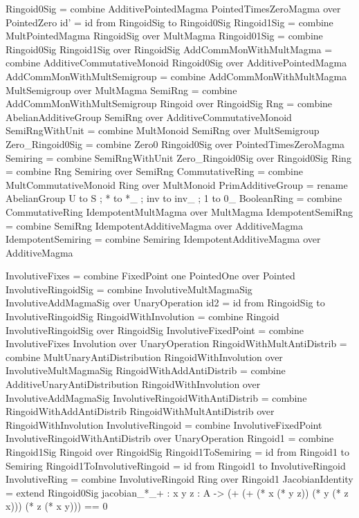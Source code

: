 \begin{togcode} 
Ringoid0Sig = 
  combine AdditivePointedMagma {} PointedTimesZeroMagma {} 
  over PointedZero
id' = id from RingoidSig to Ringoid0Sig 
Ringoid1Sig = combine MultPointedMagma {} RingoidSig {} over MultMagma
Ringoid01Sig = combine Ringoid0Sig {} Ringoid1Sig {} over RingoidSig
AddCommMonWithMultMagma = 
  combine AdditiveCommutativeMonoid {} Ringoid0Sig {} 
  over AdditivePointedMagma
AddCommMonWithMultSemigroup = 
  combine AddCommMonWithMultMagma {} MultSemigroup {} over MultMagma
SemiRng = 
  combine AddCommMonWithMultSemigroup {} Ringoid {} over RingoidSig
Rng = 
  combine AbelianAdditiveGroup {} SemiRng {} over AdditiveCommutativeMonoid 
SemiRngWithUnit = combine MultMonoid {} SemiRng {} over MultSemigroup 
Zero_Ringoid0Sig = 
  combine Zero0 {} Ringoid0Sig {} over PointedTimesZeroMagma
Semiring = combine SemiRngWithUnit {} Zero_Ringoid0Sig {} over Ringoid0Sig 
Ring = combine Rng {} Semiring {} over SemiRng 
CommutativeRing = combine MultCommutativeMonoid {} Ring {} over MultMonoid
PrimAdditiveGroup = 
  rename AbelianGroup {U to S ; * to *_ ; inv to inv_ ; 1 to 0_}
BooleanRing = 
  combine CommutativeRing {} IdempotentMultMagma {} over MultMagma 
IdempotentSemiRng = 
  combine SemiRng {} IdempotentAdditiveMagma {} over AdditiveMagma
IdempotentSemiring = 
  combine Semiring {} IdempotentAdditiveMagma {} over AdditiveMagma
\end{togcode} 

\begin{togcode} 
InvolutiveFixes = combine FixedPoint one PointedOne {} over Pointed
InvolutiveRingoidSig = 
  combine InvolutiveMultMagmaSig {} InvolutiveAddMagmaSig {} 
  over UnaryOperation
id2 = id from RingoidSig to InvolutiveRingoidSig 
RingoidWithInvolution = 
  combine Ringoid {} InvolutiveRingoidSig {} over RingoidSig 
InvolutiveFixedPoint = 
  combine InvolutiveFixes {} Involution {} over UnaryOperation 
RingoidWithMultAntiDistrib = 
  combine MultUnaryAntiDistribution {} RingoidWithInvolution {} 
  over InvolutiveMultMagmaSig 
RingoidWithAddAntiDistrib = 
  combine AdditiveUnaryAntiDistribution {} RingoidWithInvolution {} 
  over InvolutiveAddMagmaSig  
InvolutiveRingoidWithAntiDistrib = 
  combine RingoidWithAddAntiDistrib {} RingoidWithMultAntiDistrib {} 
  over RingoidWithInvolution
InvolutiveRingoid = 
  combine InvolutiveFixedPoint {} InvolutiveRingoidWithAntiDistrib {} 
  over UnaryOperation 
Ringoid1 = combine Ringoid1Sig {} Ringoid {} over RingoidSig
Ringoid1ToSemiring = id from Ringoid1 to Semiring
Ringoid1ToInvolutiveRingoid = id from Ringoid1 to InvolutiveRingoid
InvolutiveRing = combine InvolutiveRingoid {} Ring {} over Ringoid1 
JacobianIdentity = extend Ringoid0Sig 
     {jacobian_*_+ : {x y z : A} -> 
          (+ (+ (* x (* y z)) (* y (* z x))) (* z (* x y))) == 0}
\end{togcode} 

